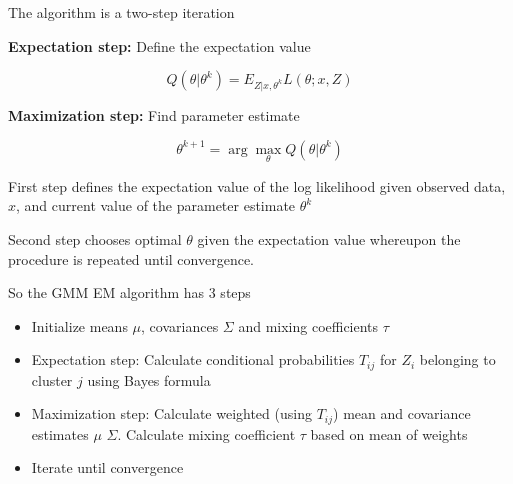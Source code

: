 The algorithm is a two-step iteration

\textbf{Expectation step:} Define the expectation value

\[
    Q(\theta | \theta^k) = E_{Z | x, \theta^k} L(\theta; x, Z)
\]

\textbf{Maximization step:} Find parameter estimate

\[
    \theta^{k+1} = \arg \max\limits_{\theta} Q(\theta | \theta^k)
\]

First step defines the expectation value of the log likelihood given
observed data, $x$, and current value of the parameter estimate $\theta^k$

Second step chooses optimal $\theta$ given the expectation value
whereupon the procedure is repeated until convergence.

So the GMM EM algorithm has 3 steps

\begin{itemize}
  \item Initialize means $\mu$, covariances $\Sigma$ and mixing coefficients $\tau$
  \item Expectation step: Calculate conditional probabilities $T_{ij}$ for $Z_i$ belonging to cluster $j$ using Bayes formula
  \item Maximization step: Calculate weighted (using $T_{ij}$) mean and covariance estimates $\mu$ $\Sigma$. Calculate mixing coefficient $\tau$ based on mean of weights
  \item Iterate until convergence
\end{itemize}
